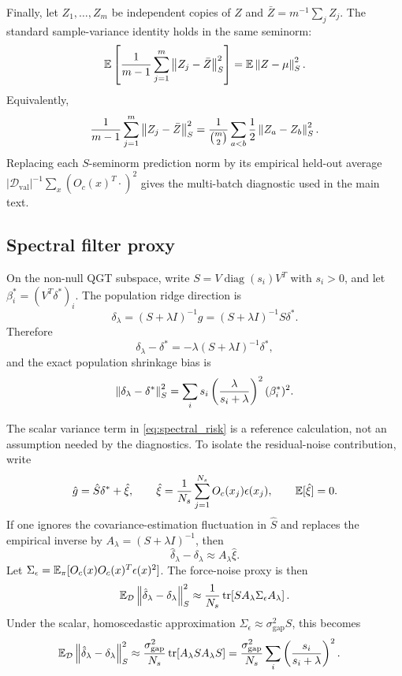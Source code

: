 Finally, let \(Z_1,\ldots,Z_m\) be independent copies of \(Z\) and
\(\bar Z=m^{-1}\sum_j Z_j\). The standard sample-variance identity holds in the
same seminorm:
\[
    \mathbb{E}\left[
        \frac1{m-1}\sum_{j=1}^m\left\| Z_j-\bar Z \right\|_S^2
    \right]
    =
    \mathbb{E}\left\| Z-\mu \right\|_S^2 .
\]
Equivalently,
\[
    \frac1{m-1}\sum_{j=1}^m\left\| Z_j-\bar Z \right\|_S^2
    =
    \frac1{\binom m2}
    \sum_{a<b}\frac12\left\| Z_a-Z_b \right\|_S^2 .
\]
Replacing each \(S\)-seminorm prediction norm by its empirical held-out average
\( |\mathcal D_{\mathrm{val}}|^{-1}\sum_x (O_c(x)^T\cdot)^2\) gives the
multi-batch diagnostic used in the main text.

\subsection{Spectral filter proxy}

On the non-null QGT subspace, write
\(S=V\operatorname{diag}(s_i)V^T\) with \(s_i>0\), and let
\(\beta_i^*=(V^T\delta^*)_i\). The population ridge direction is
\[
    \delta_\lambda=(S+\lambda I)^{-1}g
    =(S+\lambda I)^{-1}S\delta^* .
\]
Therefore
\[
    \delta_\lambda-\delta^*
    =
    -\lambda(S+\lambda I)^{-1}\delta^* ,
\]
and the exact population shrinkage bias is
\[
    \left\| \delta_\lambda-\delta^* \right\|_S^2
    =
    \sum_i
    s_i
    \left(\frac{\lambda}{s_i+\lambda}\right)^2
    (\beta_i^*)^2 .
\]

The scalar variance term in \eqref{eq:spectral_risk} is a reference calculation,
not an assumption needed by the diagnostics. To isolate the residual-noise
contribution, write
\[
    \hat g=\hat S\delta^*+\hat\xi,
    \qquad
    \hat\xi
    =
    \frac1{N_s}\sum_{j=1}^{N_s}O_c(x_j)\epsilon(x_j),
    \qquad
    \mathbb{E}[\hat\xi]=0 .
\]
If one ignores the covariance-estimation fluctuation in \(\hat S\) and replaces
the empirical inverse by \(A_\lambda=(S+\lambda I)^{-1}\), then
\[
    \hat\delta_\lambda-\delta_\lambda
    \approx
    A_\lambda\hat\xi .
\]
Let
\(\Sigma_\epsilon=\mathbb{E}_\pi[O_c(x)O_c(x)^T\epsilon(x)^2]\). The force-noise
proxy is then
\[
    \mathbb{E}_{\mathcal D}
    \left\| \hat\delta_\lambda-\delta_\lambda \right\|_S^2
    \approx
    \frac1{N_s}
    \operatorname{tr}\!\left[
        S A_\lambda \Sigma_\epsilon A_\lambda
    \right] .
\]
Under the scalar, homoscedastic approximation
\(\Sigma_\epsilon\approx\sigma_{\mathrm{gap}}^2 S\), this becomes
\[
\begin{aligned}
    \mathbb{E}_{\mathcal D}
    \left\| \hat\delta_\lambda-\delta_\lambda \right\|_S^2
    &\approx
    \frac{\sigma_{\mathrm{gap}}^2}{N_s}
    \operatorname{tr}\!\left[
        A_\lambda S A_\lambda S
    \right] =
    \frac{\sigma_{\mathrm{gap}}^2}{N_s}
    \sum_i
    \left(\frac{s_i}{s_i+\lambda}\right)^2 .
\end{aligned}
\]

